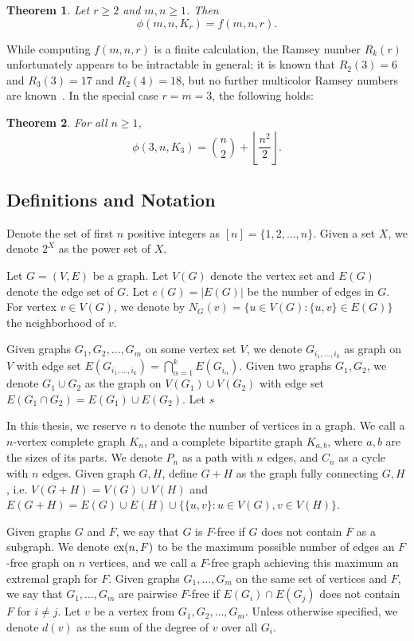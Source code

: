 \documentclass[12pt]{article}
\newtheorem{theorem}{Theorem}
\newcommand*{\ex}{\textnormal{ex}}
\begin{document}
\begin{theorem}\label{thm:blowup}
Let $r \geq 2$ and $m,n \geq 1$. Then 
\[ \phi(m,n,K_r) = f(m,n,r).\]
\end{theorem}

While computing $f(m,n,r)$ is a finite calculation, the Ramsey number $R_k(r)$ unfortunately appears to be intractable in general; it is known that $R_2(3) = 6$ and 
$R_3(3) = 17$ and $R_2(4) = 18$, but no further multicolor Ramsey numbers are known~\cite{ConlonFerber2021,Lefmann1987}. In the special case $r = m = 3$, the following holds: 

\begin{theorem}\label{thm:triangles}
  For all $n \geq 1$,
  \[
    \phi(3, n, K_3) = \binom{n}{2} + \left\lfloor \frac{n^2}{2} \right\rfloor.
  \]
\end{theorem}

\subsection{Definitions and Notation}

Denote the set of first $n$ positive integers as $[n] = \{1, 2, \ldots, n\}$. Given a set $X$, we denote $2^X$ as the power set of $X$.

Let $G = (V, E)$ be a graph. Let $V(G)$ denote the vertex set and $E(G)$ denote the edge set of $G$. Let $e(G) = |E(G)|$ be the number of edges in $G$. For vertex $v \in V(G)$, we denote by $N_G(v) = \{u \in V(G) : \{u, v\} \in E(G)\}$ the neighborhood of $v$.

Given graphs $G_1,G_2, \ldots, G_m$ on some vertex set $V$, we denote $G_{i_1, \ldots, i_k}$ as graph on $V$ with edge set $E(G_{i_1, \ldots, i_k}) = \bigcap_{\alpha = 1}^k E(G_{i_\alpha})$. Given two graphs $G_1, G_2$, we denote $G_1 \cup G_2$ as the graph on $V(G_1) \cup V(G_2)$ with edge set $E(G_1 \cap G_2) = E(G_1) \cup E(G_2)$. Let $s$

In this thesis, we reserve $n$ to denote the number of vertices in a graph. We call a $n$-vertex complete graph $K_n$, and a complete bipartite graph $K_{a, b}$, where $a, b$ are the sizes of its parts. We denote $P_n$ as a path with $n$ edges, and $C_n$ as a cycle with $n$ edges. Given graph $G, H$, define $G + H$ as the graph fully connecting $G, H$, i.e. $V(G + H) = V(G) \cup V(H)$ and $E(G + H) = E(G) \cup E(H) \cup \{\{u, v\} : u \in V(G), v \in V(H)\}$.

Given graphs $G$ and $F$, we say that $G$ is $F$-free if $G$ does not contain $F$ as a subgraph. We denote $\ex(n, F)$ to be the maximum possible number of edges an $F$-free graph on $n$ vertices, and we call a $F$-free graph achieving this maximum an extremal graph for $F$. Given graphs $G_1, \ldots, G_m$ on the same set of vertices and $F$, we say that $G_1, \ldots, G_m$ are pairwise $F$-free if $E(G_i) \cap E(G_j)$ does not contain $F$ for $i \neq j$. Let $v$ be a vertex from $G_1, G_2, \ldots, G_m$. Unless otherwise specified, we denote $d(v)$ as the sum of the degree of $v$ over all $G_i$.
\end{document}

